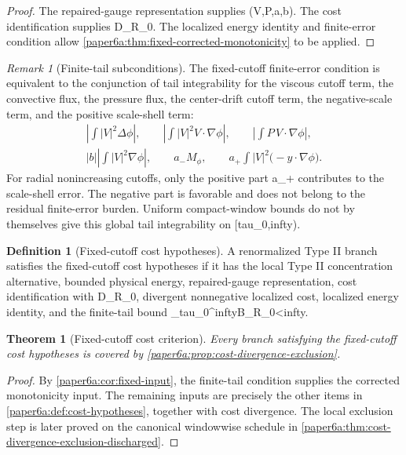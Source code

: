 \documentclass[11pt]{amsart}
\def\({}%
\def\){}%
\def\tilde#1{#1}%
\def\mathfrak#1{#1}%
\def\tau{tau}%
\def\infty{infty}%
\theoremstyle{plain}
\newtheorem{theorem}{Theorem}[section]
\theoremstyle{definition}
\newtheorem{definition}[definition]{Definition}
\theoremstyle{remark}
\newtheorem{remark}[remark]{Remark}
\begin{document}
\begin{proof}
The repaired-gauge representation supplies \((V,P,a,b)\).  The cost
identification supplies \(\tilde{\mathfrak D}_{R_0}\).  The localized energy
identity and finite-error condition allow
\cref{paper6a:thm:fixed-corrected-monotonicity} to be applied.
\end{proof}

\begin{remark}[Finite-tail subconditions]\label{paper6a:rem:fixed-tail-subconditions}
The fixed-cutoff finite-error condition is equivalent to the conjunction of tail
integrability for the viscous cutoff term, the convective flux, the pressure
flux, the center-drift cutoff term, the negative-scale term, and the
positive scale-shell term:
\[
\begin{gathered}
  \left|\int |V|^2\Delta\phi\right|,\qquad
  \left|\int |V|^2V\cdot\nabla\phi\right|,\qquad
  \left|\int P\,V\cdot\nabla\phi\right|,\\
  |b|\left|\int |V|^2\nabla\phi\right|,\qquad
  a_-M_\phi,\qquad
  a_+\int |V|^2\bigl(-y\cdot\nabla\phi\bigr).
\end{gathered}
\]
For radial nonincreasing cutoffs, only the positive part \(a_+\) contributes to
the scale-shell error.  The negative part is favorable and does not belong to
the residual finite-error burden.
Uniform compact-window bounds do not by themselves give this global tail
integrability on \([\tau_0,\infty)\).
\end{remark}

\begin{definition}[Fixed-cutoff cost hypotheses]\label{paper6a:def:direct-fixed-data}
A renormalized Type II branch satisfies the fixed-cutoff cost hypotheses if it
has the local Type II concentration alternative, bounded physical energy,
repaired-gauge representation, cost identification with
\(\tilde{\mathfrak D}_{R_0}\), divergent nonnegative localized cost, localized
energy identity, and the finite-tail bound
\(\int_{\tau_0}^{\infty}B_{R_0}<\infty\).
\end{definition}

\begin{theorem}[Fixed-cutoff cost criterion]\label{paper6a:thm:fixed-cost-criterion}
Every branch satisfying the fixed-cutoff cost hypotheses is covered by
\cref{paper6a:prop:cost-divergence-exclusion}.
\end{theorem}

\begin{proof}
By \cref{paper6a:cor:fixed-input}, the finite-tail condition supplies the
corrected monotonicity input.  The remaining inputs are precisely the other
items in \cref{paper6a:def:cost-hypotheses}, together with cost divergence.
The local exclusion step is later proved on the canonical windowwise
schedule in \cref{paper6a:thm:cost-divergence-exclusion-discharged}.
\end{proof}
\end{document}
